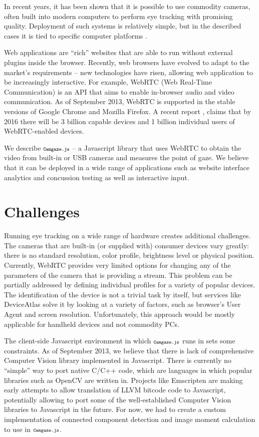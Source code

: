 \documentclass[annual]{acmsiggraph}
\newcommand{\Acronym}[1]{\ensuremath{{\small{\texttt{#1}}}}}
\newcommand{\Name}{\Acronym{Camgaze.js}} \newcommand{\False}{\Constant{false}}
\newcommand{\Constant}[1]{\ensuremath{\small{\texttt{#1}}}}
\begin{document}
In recent years, it has been shown \cite{SanAgustin2009}\cite{Sewell2010}
that it is possible to use commodity cameras, often built into modern
computers to perform eye tracking with promising quality. Deployment of such
systems is relatively simple, but in the described cases it is tied to specific
computer platforms \cite{holland2012eye}.

Web applications are “rich” websites that are able to run without external
plugins inside the browser. Recently, web browsers have evolved to adapt to
the market’s requirements – new technologies have risen, allowing web
application to be increasingly interactive. For example, WebRTC (Web Real-Time
Communication) is an API that aims to enable in-browser audio and video
communication. As of September 2013, WebRTC is supported in the stable versions
of Google Chrome and Mozilla Firefox. A recent report
\cite{DisruptiveAnalysis2013}, claims that by 2016 there will be
3 billion capable devices and 1 billion individual users of WebRTC-enabled
devices.

We describe $\Name$ -- a Javascript library that uses WebRTC to obtain the
video from built-in or USB cameras and measures the point of gaze. We believe
that it can be deployed in a wide range of applications such as website
interface analytics and concussion testing as well as interactive input.


\section{Challenges}

Running eye tracking on a wide range of hardware creates additional challenges.
The cameras that are built-in (or supplied with) consumer devices vary greatly:
there is no standard resolution, color profile, brightness level or physical
position. Currently, WebRTC provides very limited options for changing any of
the parameters of the camera that is providing a stream. This problem can be
partially addressed by defining individual profiles for a variety of popular
devices. The identification of the device is not a trivial task by itself, but
services like DeviceAtlas \cite{DeviceAtlas2013} solve it by looking at a
variety of factors, such as browser’s User Agent and screen resolution.
Unfortunately, this approach would be mostly applicable for handheld devices
and not commodity PCs.

The client-side Javascript environment in which $\Name$ runs in sets some
constraints. As of September 2013, we believe that there is lack of
comprehensive Computer Vision library implemented in Javascript. There is
currently no “simple” way to port native C/C++ code, which are languages in
which popular libraries such as OpenCV are written in. Projects like Emscripten
are making early attempts to allow translation of LLVM bitcode code to
Javascript, potentially allowing to port some of the well-established Computer
Vision libraries to Javascript in the future. For now, we had to create a
custom implementation of connected component detection and image moment
calculation to use in $\Name$.
\end{document}
